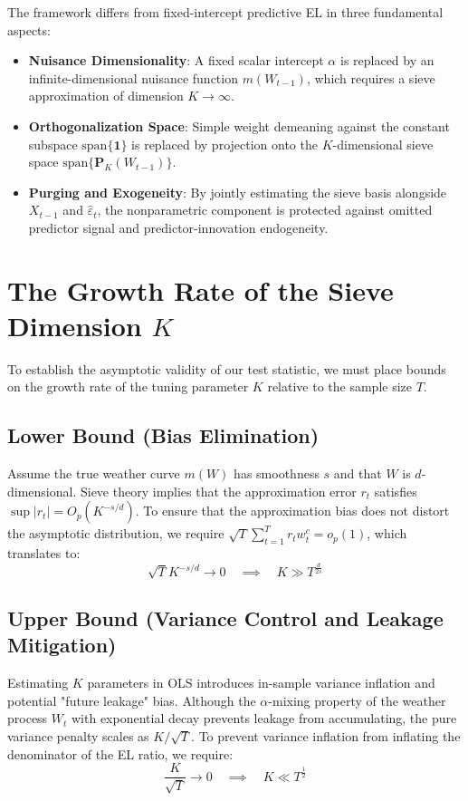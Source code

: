 \documentclass{article}
\begin{document}
The framework differs from fixed-intercept predictive EL in three fundamental aspects:
\begin{itemize}
    \item \textbf{Nuisance Dimensionality}: A fixed scalar intercept $\alpha$ is replaced by an infinite-dimensional nuisance function $m(W_{t-1})$, which requires a sieve approximation of dimension $K \to \infty$.
    \item \textbf{Orthogonalization Space}: Simple weight demeaning against the constant subspace $\text{span}\{\bm{1}\}$ is replaced by projection onto the $K$-dimensional sieve space $\text{span}\{\bm{P}_K(W_{t-1})\}$.
    \item \textbf{Purging and Exogeneity}: By jointly estimating the sieve basis alongside $X_{t-1}$ and $\widehat{\varepsilon}_t$, the nonparametric component is protected against omitted predictor signal and predictor-innovation endogeneity.
\end{itemize}

\section{The Growth Rate of the Sieve Dimension $K$}

To establish the asymptotic validity of our test statistic, we must place bounds on the growth rate of the tuning parameter $K$ relative to the sample size $T$.

\subsection{Lower Bound (Bias Elimination)}
Assume the true weather curve $m(W)$ has smoothness $s$ and that $W$ is $d$-dimensional. Sieve theory implies that the approximation error $r_t$ satisfies $\sup |r_t| = O_p(K^{-s/d})$. To ensure that the approximation bias does not distort the asymptotic distribution, we require $\sqrt{T} \sum_{t=1}^T r_t w^c_t = o_p(1)$, which translates to:
\begin{equation}
    \sqrt{T} K^{-s/d} \to 0 \quad \implies \quad K \gg T^{\frac{d}{2s}}
\end{equation}

\subsection{Upper Bound (Variance Control and Leakage Mitigation)}
Estimating $K$ parameters in OLS introduces in-sample variance inflation and potential "future leakage" bias. Although the $\alpha$-mixing property of the weather process $W_t$ with exponential decay prevents leakage from accumulating, the pure variance penalty scales as $K / \sqrt{T}$. To prevent variance inflation from inflating the denominator of the EL ratio, we require:
\begin{equation}
    \frac{K}{\sqrt{T}} \to 0 \quad \implies \quad K \ll T^{\frac{1}{2}}
\end{equation}
\end{document}
